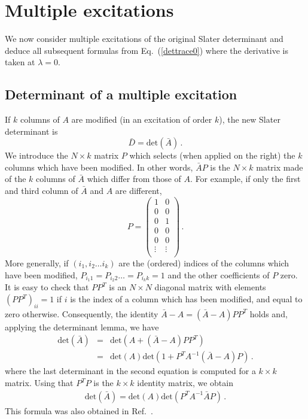 \documentclass[aip,jcp,reprint,floatfix,onecolumn]{revtex4-1}
\def\det{\text{det}}
\def\A{A}
\def\wdet{D}
\begin{document}
\section{Multiple excitations}
\label{mexc}

We now consider multiple excitations of the original Slater determinant and deduce all subsequent formulas from Eq.~(\ref{dettrace0})
where the derivative is taken at $\lambda=0$.


\subsection{Determinant of a multiple excitation}

If $k$ columns of $\A$ are  modified (in an excitation of order $k$), the new Slater determinant is
\begin{equation}
\bar{\wdet} = \det (\bar{A})\,.
\end{equation}
We introduce the $N \times k$ matrix $P$ which selects (when applied on the right) the $k$ columns which have been modified.
In other words, $\bar{A} P$ is the $N \times k$ matrix made of the   $k$ columns of   $\bar{A}$ which differ from those of $A$.
For example, if only the first and third column of $\bar{A}$ and $A$ are different,
\begin{equation}
P = \left( \begin{array}{cccccc}
1 & 0  \\
0 & 0  \\
0 & 1  \\
0 & 0  \\
0 & 0  \\
\vdots & \vdots \\
\end{array} \right)\,.
\end{equation}
More generally, if $(i_1, i_2 \dots i_k)$ %
are the (ordered) indices of the columns which have been modified, $P_{i_1 1}=P_{i_2 2} \dots = P_{i_k k }=1$ and the other coefficients of $P$ zero.
It is easy to check that $P P^T$ is an $N \times N$ diagonal matrix  with elements $(P P^T)_{ii}=1$ if $i$ is
the index of a column which has been modified, and equal to zero otherwise.
Consequently, the identity  $\bar{A}-A = (\bar{A}-A)P P^T $ holds and, applying the determinant lemma, we have
\begin{eqnarray}
\det (\bar{\A})
&  =& \det(A + (\bar{A}-A)P P^T) \nonumber\\
& = & \det (\A) \det (1 +  P^T \A^{-1} (\bar{\A}-\A) P)\,.
\end{eqnarray}
where the last determinant in the second equation is computed for a $k \times k$ matrix.
Using that $P^T P$ is the $k\times k$ identity matrix, we obtain
\begin{eqnarray}
\det (\bar{\A}) = \det (\A)  \det (P^T \A^{-1} \bar{\A} P)\,.
\label{detk0}
\end{eqnarray}
This formula was also obtained in Ref.~.
\end{document}
